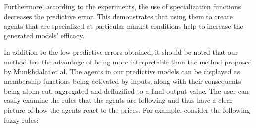 \documentclass{ieeeaccess}
\begin{document}
Furthermore, according to the experiments, the use of specialization
functions decreases the predictive error. This demonstrates that using
them to create agents that are specialized at
particular market conditions help to increase the generated models'
efficacy.










In addition to the low predictive errors obtained, it should be noted
that our method has the advantage of being more interpretable than the
method proposed by Munkhdalai et al. The agents in our predictive models can
be displayed as membership functions being activated by inputs,
along with their consequents being alpha-cut, aggregated and
deffuzified to a final output value. The user can easily examine the
rules that the agents are following and thus have a clear picture of
how the agents react to the prices. For example, consider the
following fuzzy rules:
\end{document}
